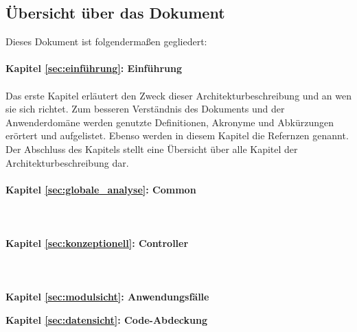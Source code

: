 \subsection{Übersicht über das Dokument}
Dieses Dokument ist folgendermaßen gegliedert:\\
\\
\textbf{Kapitel \ref{sec:einführung}: Einführung} %
\\
\\
{  Das erste Kapitel erläutert den Zweck dieser Architekturbeschreibung und an wen sie sich richtet. Zum besseren Verständnis des Dokuments und der Anwenderdomäne werden genutzte Definitionen, Akronyme und Abkürzungen erörtert und aufgelistet. 
Ebenso werden in diesem Kapitel die Refernzen genannt. Der Abschluss des Kapitels stellt eine Übersicht über alle Kapitel der Architekturbeschreibung dar.}
\\
\\

\textbf{Kapitel \ref{sec:globale_analyse}: Common} %
\\
\\
{ }
\\
\\

\textbf{Kapitel \ref{sec:konzeptionell}: Controller} %
\\
\\
{}
\\
\\

\textbf{Kapitel \ref{sec:modulsicht}: Anwendungsfälle} %
{}


\textbf{Kapitel \ref{sec:datensicht}: Code-Abdeckung} %
\\
\\
{ }
\\
\\
